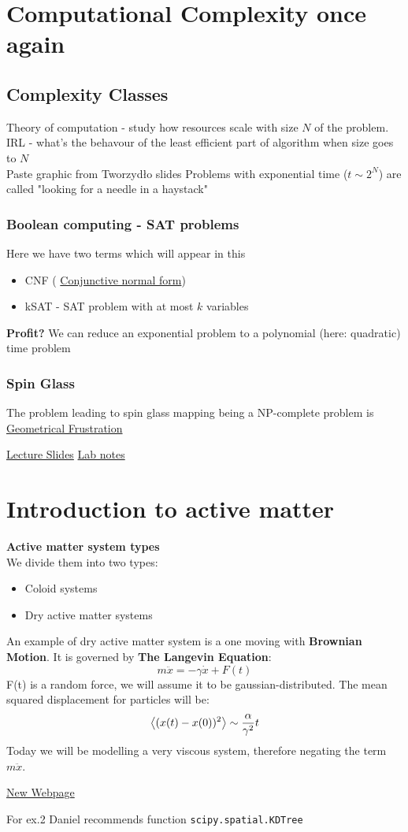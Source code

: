 \documentclass[12pt,a4paper]{report}
\newcommand{\com}[1]{{\color{red} #1}}
\newcommand{\link}[2]{{\color{cyan} \href{#1}{#2}}}
\newcounter{lec}
\newenvironment{lecture}[1]{\par\medskip
   \noindent\chapter{#1} \rmfamily}{\medskip}
\renewcommand{\emph}{\textbf}
\begin{document}
\begin{lecture}{Computational Complexity once again}
\section{Complexity Classes}
Theory of computation - study how resources scale with size $N$ of the problem. IRL - what's the behavour of the least efficient part of algorithm when size goes to $N$\\
\com{Paste graphic from Tworzydło slides}
Problems with exponential time ($t \sim 2^N$) are called "looking for a needle in a haystack"
\subsection{Boolean computing - SAT problems}
Here we have two terms which will appear in this
\begin{itemize}
    \item CNF (\link{https://en.wikipedia.org/wiki/Conjunctive_normal_form}{Conjunctive normal form}) 
    \item kSAT - SAT problem with at most $k$ variables
\end{itemize}
\emph{Profit?} We can reduce an exponential problem to a polynomial (here: quadratic) time problem

\subsection{Spin Glass}
The problem leading to spin glass mapping being a NP-complete problem is \link{https://en.wikipedia.org/wiki/Geometrical_frustration}{Geometrical Frustration}

\link{http://studenci.fuw.edu.pl/~kc427902/CMCS_2022/lab3.pdf}{Lecture Slides} \link{http://studenci.fuw.edu.pl/~kc427902/CMCS_2022/lect3.pdf}{Lab notes}
\end{lecture}


\begin{lecture}{Introduction to active matter}
    \emph{Active matter system types}\\
    We divide them into two types:
    \begin{itemize}
        \item Coloid systems
        \item Dry active matter systems
    \end{itemize}
     An example of dry active matter system is a one moving with \emph{Brownian Motion}. It is governed by \emph{The Langevin Equation}:
     \[
         m \ddot{x} = -\gamma \dot{x} + F(t)
     \]
     F(t) is a random force, we will assume it to be gaussian-distributed.
     The mean squared displacement for particles will be:
     \[
         \ev{(x(t) - x(0))^2} \sim \frac{\alpha}{\gamma^2} t
     \]
     Today we will be modelling a very viscous system, therefore negating the term $m \ddot{x}$.
\end{lecture}

\link{https://sites.google.com/uw.edu.pl/cmpp2022}{New Webpage}

For ex.2 Daniel recommends function \verb|scipy.spatial.KDTree|

\printindex
\end{document}
